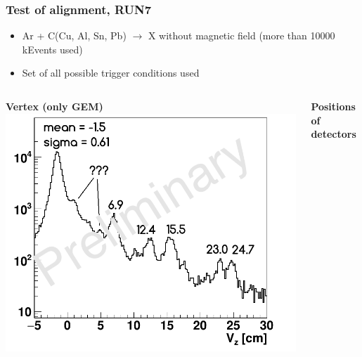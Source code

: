 \documentclass[dvipsnames, aspectratio=43] {beamer}
\begin{document}
\begin{frame}
  \bf
  \frametitle{\bf \centering Test of alignment, RUN7}
  \begin{block}{}
    \begin{itemize}
    \item Ar + C(Cu, Al, Sn, Pb) $\rightarrow$ X without magnetic field (more than 10000 kEvents used)
    \item Set of all possible trigger conditions used
    \end{itemize}
  \end{block}
  \begin{columns}[c]
    \begin{block}{\bf \centering Vertex (only GEM)}
      \includegraphics[width=1.\linewidth]{VpZ_corr.png}
    \end{block}
    \begin{block}{\bf \centering Positions of detectors}

\end{block}
\end{columns}
\end{frame}
\end{document}
